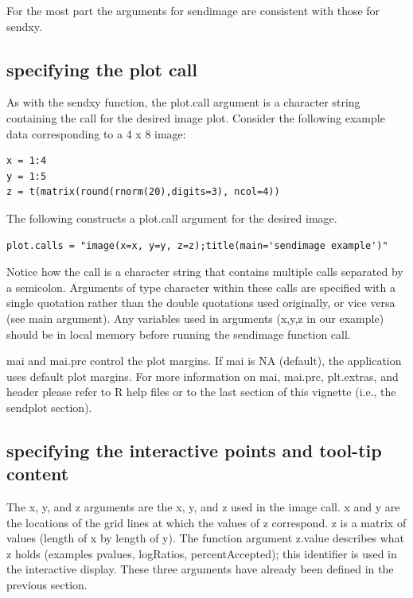 \documentclass[]{article}
\begin{document}
For the most part the arguments for sendimage are consistent with those for sendxy. 

\subsection{specifying the plot call}
As with the sendxy function, the plot.call argument is a character string containing the call for the desired image plot. Consider the following example data corresponding to a 4 x 8 image:
\begin{verbatim}
x = 1:4
y = 1:5
z = t(matrix(round(rnorm(20),digits=3), ncol=4))
\end{verbatim}



The following constructs a plot.call argument for the desired image. 

\begin{verbatim}
plot.calls = "image(x=x, y=y, z=z);title(main='sendimage example')"
\end{verbatim}


Notice how the call is a character string that contains multiple calls separated by a semicolon.  Arguments of type character within these calls are specified with a single quotation rather than the double quotations used originally, or vice versa (see main argument). Any variables used in arguments (x,y,z in our example) should be in local memory before running the sendimage function call. \newline


\indent mai and mai.prc control the plot margins. If mai is NA (default), the application uses default plot margins. For more information on mai, mai.prc, plt.extras, and header please refer to R help files or to the last section of this vignette (i.e., the sendplot section). \newline


\subsection{specifying the interactive points and tool-tip content}

\indent The x, y, and z arguments are the x, y, and z used in the image call. x and y are the locations of the grid lines at which the values of z correspond. z is a matrix of values (length of x  by length of y). The function argument z.value describes what z holds (examples pvalues, logRatios, percentAccepted); this identifier is used in the interactive display. These three arguments have already been defined in the previous section. \\
\end{document}
